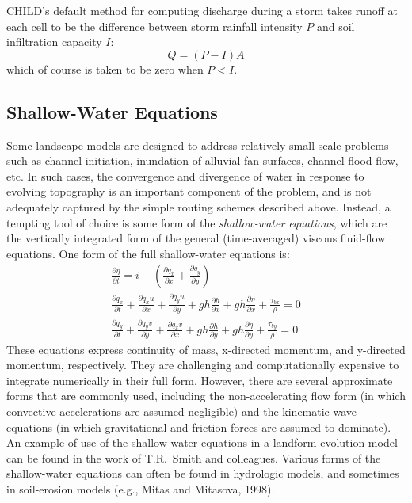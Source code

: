 \documentclass[12pt]{amsart}
\begin{document}
CHILD's default method for computing discharge during a storm takes runoff at each cell to be the difference between storm rainfall intensity $P$ and soil infiltration capacity $I$:
\begin{equation}
Q = (P-I) A
\end{equation}
which of course is taken to be zero when $P<I$.


\subsection{Shallow-Water Equations}

Some landscape models are designed to address relatively small-scale problems such as channel initiation, inundation of alluvial fan surfaces, channel flood flow, etc. In such cases, the convergence and divergence of water in response to evolving topography is an important component of the problem, and is not adequately captured by the simple routing schemes described above. Instead, a tempting tool of choice is some form of the {\em shallow-water equations}, which are the vertically integrated form of the general (time-averaged) viscous fluid-flow equations. One form of the full shallow-water equations is:
\begin{eqnarray}
\frac{\partial \eta}{\partial t} = i - \left( \frac{\partial q_x}{\partial x}
+ \frac{\partial q_y}{\partial y} \right ) \\
\frac{\partial q_x}{\partial t} + \frac{\partial q_x u}{\partial x}
+ \frac{\partial q_y u}{\partial y}
+ g h \frac{\partial h}{\partial x}
+ g h \frac{\partial \eta}{\partial x}
+ \frac{\tau_{bx}}{\rho} = 0 \\
\frac{\partial q_y}{\partial t} + \frac{\partial q_y v}{\partial y}
+ \frac{\partial q_x v}{\partial x}
+ g h \frac{\partial h}{\partial y}
+ g h \frac{\partial \eta}{\partial y}
+ \frac{\tau_{by}}{\rho} = 0
\end{eqnarray}
These equations express continuity of mass, x-directed momentum, and y-directed momentum, respectively. They are challenging and computationally expensive to integrate numerically in their full form. However, there are several approximate forms that are commonly used, including the non-accelerating flow form (in which convective accelerations are assumed negligible) and the kinematic-wave equations (in which gravitational and friction forces are assumed to dominate). An example of use of the shallow-water equations in a landform evolution model can be found in the work of T.R.\ Smith and colleagues. Various forms of the shallow-water equations can often be found in hydrologic models, and sometimes in soil-erosion models (e.g., Mitas and Mitasova, 1998\nocite{mitas1998distributed}).
\end{document}

